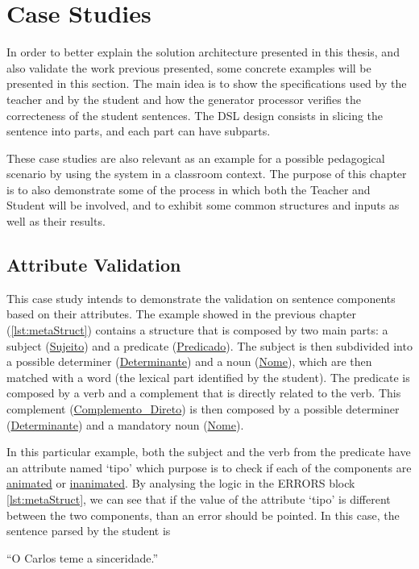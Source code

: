 \chapter{Case Studies} \label{case_study}
In order to better explain the solution architecture presented in this thesis, and also validate the work previous presented, 
some concrete examples will be presented in this section. 
The main idea is to show the specifications used by the teacher and by the student and how the generator processor verifies the correcteness of the student sentences. 
The DSL design consists in slicing the sentence into parts, and each part can have subparts.

These case studies are also relevant as an example for a possible pedagogical scenario by using the system in a classroom context.
The purpose of this chapter is to also demonstrate some of the process in which both the Teacher and Student will be involved, and to exhibit some common structures
and inputs as well as their results.

\section{Attribute Validation}
This case study intends to demonstrate the validation on sentence components based on their attributes. The example showed in the previous chapter 
(\autoref{lst:metaStruct}) contains a structure that is composed by two main parts: a subject (\underline{Sujeito}) and a predicate (\underline{Predicado}). 
The subject is then subdivided into a possible determiner (\underline{Determinante}) and a noun (\underline{Nome}), which are then matched with a word 
(the lexical part identified by the student). The predicate is composed by a verb and a complement that is directly related to the verb. This complement 
(\underline{Complemento\_Direto}) is then composed by a possible determiner (\underline{Determinante}) and a mandatory noun (\underline{Nome}).

In this particular example, both the subject and the verb from the predicate have an attribute named ‘tipo’ which purpose is to check if each of the components
are \underline{animated} or \underline{inanimated}. By analysing the logic in the ERRORS block \autoref{lst:metaStruct}, we can see that if the value of the attribute ‘tipo’ is different 
between the two components, than an error should be pointed. In this case, the sentence parsed by the student is

``O Carlos teme a sinceridade.''

